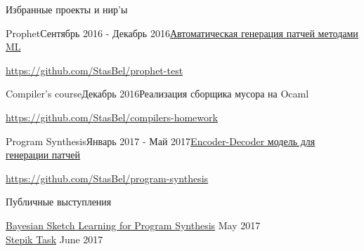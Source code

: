 \documentclass{resume} %
\begin{document}

\begin{rSection}{Избранные проекты и нир'ы} \itemsep -3pt  

\begin{rSubsection}{Prophet}{Сентябрь 2016 - Декабрь 2016}{\href{https://drive.google.com/file/d/0B6udzTbX1EFPTFZMSS1RVUVvXzg/view?usp=sharing}{Автоматическая генерация патчей методами ML}}{}
\item[] \url{https://github.com/StasBel/prophet-test}
\end{rSubsection}

\begin{rSubsection}{Compiler's course}{Декабрь 2016}{Реализация сборщика мусора на Ocaml}{}
\item[] \url{https://github.com/StasBel/compilers-homework}
\end{rSubsection}

\begin{rSubsection}{Program Synthesis}{Январь 2017 - Май 2017}{\href{https://docs.google.com/presentation/d/113EFcW8L7p8ickhfMoht8ivOomq2fRPizLtWSH9cSX4/pub?start=false&loop=false&delayms=3000}{Encoder-Decoder модель для генерации патчей}}{}
\item[] \url{https://github.com/StasBel/program-synthesis}
\end{rSubsection}

\end{rSection}


\begin{rSection}{Публичные выступления} \itemsep -3pt  

{\href{https://docs.google.com/presentation/d/1ieE0JZWKbCQH_qpH81M1pSbUSARBP7DKLdGVwk563pM/pub?start=false&loop=false&delayms=3000}{Bayesian Sketch Learning for Program Synthesis}} \hfill May 2017 \\ 
{\href{https://docs.google.com/presentation/d/19FyHBksjffXY6nF1B1xRvkkW-lSp0QIPzU_o-h5RD00/pub?start=false&loop=false&delayms=3000}{Stepik Task}} \hfill June 2017 \\
\end{rSection} 

\end{document}
